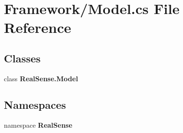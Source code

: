 \section{Framework/\+Model.cs File Reference}
\label{_model_8cs}
\subsection*{Classes}
\begin{DoxyCompactItemize}
\item 
class \textbf{ Real\+Sense.\+Model}
\end{DoxyCompactItemize}
\subsection*{Namespaces}
\begin{DoxyCompactItemize}
\item 
namespace \textbf{ Real\+Sense}
\end{DoxyCompactItemize}
